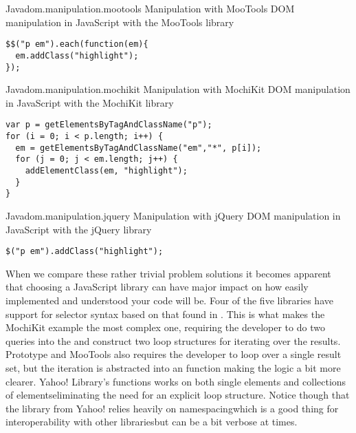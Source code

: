 \begin{scode}{Java}{dom.manipulation.mootools}{%
   Manipulation with MooTools}{%
  DOM manipulation in JavaScript with the MooTools library}
\begin{lstlisting}
$$("p em").each(function(em){
  em.addClass("highlight");
});
\end{lstlisting}
\end{scode}

\begin{scode}{Java}{dom.manipulation.mochikit}{%
   Manipulation with MochiKit}{%
  DOM manipulation in JavaScript with the MochiKit library}
\begin{lstlisting}
var p = getElementsByTagAndClassName("p");
for (i = 0; i < p.length; i++) {
  em = getElementsByTagAndClassName("em","*", p[i]);
  for (j = 0; j < em.length; j++) {
    addElementClass(em, "highlight");
  }
}
\end{lstlisting}
\end{scode}

\begin{scode}{Java}{dom.manipulation.jquery}{%
   Manipulation with jQuery}{%
  DOM manipulation in JavaScript with the jQuery library}
\begin{lstlisting}
$("p em").addClass("highlight");
\end{lstlisting}
\end{scode}

When we compare these rather trivial problem solutions it becomes apparent
that choosing a JavaScript library can have major impact on how easily
implemented and understood your code will be. Four of the five libraries
have support for selector syntax based on
that found in %
.
This is what makes the MochiKit example the most complex one, requiring the
developer to do two queries into the  and construct two
loop structures for iterating over the results.
Prototype and MooTools also requires the developer to loop over a single
result set, but the iteration is abstracted into an  function
making the logic a bit more clearer. Yahoo!  Library's 
functions works on both single elements and collections of
elements\dash{}eliminating the need for an explicit loop structure.
Notice though that the library from
Yahoo! relies heavily on namespacing\dash{}which is a good thing for
interoperability with other libraries\dash{}but can be a bit verbose at times.

